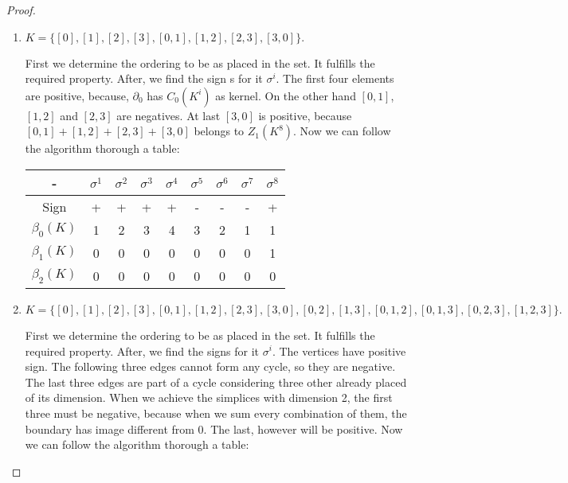 \begin{proof}

\begin{enumerate}
    \item    $K = \{[0], [1], [2], [3], [0, 1], [1, 2], [2, 3], [3, 0]\}.$
    
    First we determine the ordering to be as placed in the set. It fulfills the
    required property. After, we find the sign  s for it $\sigma^i$. The first
    four elements are positive, because, $\partial_0$ has $C_0(K^i)$ as
    kernel. On the other hand $[0,1]$, $[1,2]$ and $[2,3]$ are negatives. At
    last $[3,0]$ is positive, because $[0,1] + [1,2] + [2,3] + [3,0]$ belongs
    to $Z_1(K^8)$. Now we can follow the algorithm thorough a table: 

    \begin{center}
        \begin{tabular}{ c|c|c|c|c|c|c|c|c}
         - & $\sigma^1$ & $\sigma^2$ & $\sigma^3$ & $\sigma^4$ & $\sigma^5$ &
         $\sigma^6$ & $\sigma^7$ &$\sigma^8$ \\ 
         \hline
         Sign & + & + & + & + & - & - & - & + \\  
         $\beta_0(K)$ & 1 & 2 & 3 & 4 & 3 & 2 & 1 & 1 \\ 
         $\beta_1(K)$ & 0 & 0 & 0 & 0 & 0 & 0 & 0 & 1\\     
         $\beta_2(K)$ & 0 & 0 & 0 & 0 & 0 & 0 & 0 & 0\\     

        \end{tabular}
    \end{center}

    \item  $K = \{[0], [1], [2], [3], [0, 1], [1, 2], [2, 3], [3, 0], [0, 2], [1, 3], [0, 1, 2], [0, 1, 3], [0, 2, 3], [1, 2, 3]\}.
    $
    
    First we determine the ordering to be as placed in the set. It fulfills
    the required property. After, we find the signs for it $\sigma^i$.  The vertices have positive sign. The following three edges cannot form any cycle, so they are negative. The last three edges are part of a cycle considering three other already placed of its dimension. When we achieve the simplices with dimension 2, the first three must be negative, because when we sum every combination of them, the boundary has image different from 0. The last, however will be positive.  
    Now we can follow the algorithm thorough a table: 


\end{enumerate}
\end{proof}

